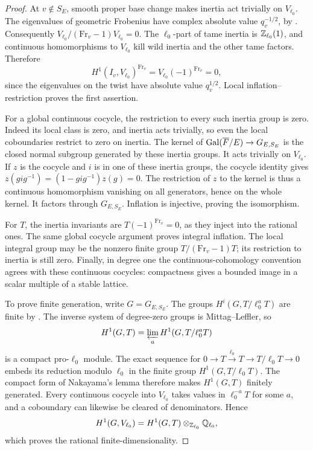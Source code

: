 \begin{proof}
At \(v\notin S_E\), smooth proper base change makes inertia act
trivially on \(V_{\ell_0}\). The eigenvalues of geometric
Frobenius have complex absolute value \(q_v^{-1/2}\), by
\cite[Theorem~1.6]{DeligneWeil}. Consequently
\(V_{\ell_0}/(\mathrm{Fr}_v-1)V_{\ell_0}=0\).
The \(\ell_0\)-part of tame inertia is \(\mathbb Z_{\ell_0}(1)\),
and continuous homomorphisms to \(V_{\ell_0}\) kill wild inertia
and the other tame factors. Therefore
\[
 H^1(I_v,V_{\ell_0})^{\mathrm{Fr}_v}
   =V_{\ell_0}(-1)^{\mathrm{Fr}_v}=0,
\]
since the eigenvalues on the twist have absolute value
\(q_v^{1/2}\). Local inflation--restriction proves the first
assertion.

For a global continuous cocycle, the restriction to every such
inertia group is zero. Indeed its local class is zero, and
inertia acts trivially, so even the local coboundaries restrict to
zero on inertia. The kernel of
\(\operatorname{Gal}(\overline F/E)\to G_{E,S_E}\) is the closed normal subgroup
generated by these inertia groups. It acts trivially on
\(V_{\ell_0}\). If \(z\) is the cocycle and \(i\) is in one
of these inertia groups, the cocycle identity gives
\(z(gig^{-1})=(1-gig^{-1})z(g)=0\).
The restriction of \(z\) to the kernel is thus a continuous
homomorphism vanishing on all generators, hence on the whole
kernel. It factors through \(G_{E,S_E}\). Inflation is
injective, proving the isomorphism.

For \(T\), the inertia invariants are
\(T(-1)^{\mathrm{Fr}_v}=0\), as they inject into the rational
ones. The same global cocycle argument proves integral inflation.
The local integral group may be the nonzero finite group
\(T/(\mathrm{Fr}_v-1)T\); its restriction to inertia is still
zero. Finally, in degree one the continuous-cohomology convention
agrees with these continuous cocycles: compactness gives a bounded
image in a scalar multiple of a stable lattice.

To prove finite generation, write \(G=G_{E,S_E}\). The groups
\(H^i(G,T/\ell_0^aT)\) are finite by
\cite[Corollary~I.4.15]{Milne}. The inverse system of degree-zero
groups is Mittag--Leffler, so
\[
 H^1(G,T)=\varprojlim_a H^1(G,T/\ell_0^aT)
\]
is a compact pro-\(\ell_0\) module. The exact sequence for
\(0\to T\xrightarrow{\ell_0}T\to T/\ell_0T\to0\)
embeds its reduction modulo \(\ell_0\) in the finite group
\(H^1(G,T/\ell_0T)\). The compact form of Nakayama's lemma
therefore makes \(H^1(G,T)\) finitely generated. Every continuous
cocycle into \(V_{\ell_0}\) takes values in
\(\ell_0^{-a}T\) for some \(a\), and a coboundary can likewise
be cleared of denominators. Hence
\[
 H^1(G,V_{\ell_0})=H^1(G,T)\otimes_{\mathbb Z_{\ell_0}}\mathbb Q_{\ell_0},
\]
which proves the rational finite-dimensionality.
\end{proof}

